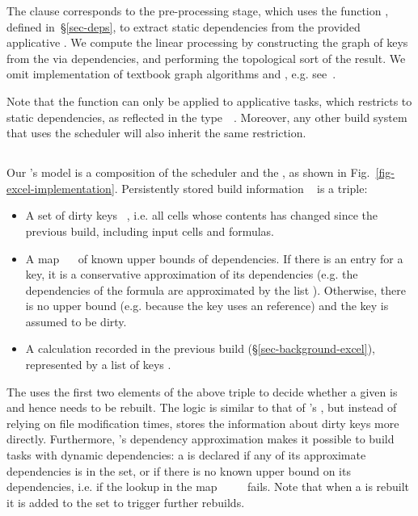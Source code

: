 The  clause corresponds to the pre-processing stage, which uses the
function , defined in~\S\ref{sec-deps}, to extract static
dependencies from the provided applicative . We compute the linear
processing  by constructing the graph of keys  from the
 via dependencies, and performing the topological sort of the result.
We omit implementation of textbook graph algorithms
 and , e.g. see~\cite{cormen2001introduction}.

Note that the function  can only be applied to applicative
tasks, which restricts \Make to static dependencies, as reflected in the
type~~. Moreover, any other build system that uses
the  scheduler will also inherit the same restriction.

\subsection{\Excel}\label{sec-implementation-excel}

Our \Excel's model is a composition of the  scheduler and the
, as shown in Fig.~\ref{fig-excel-implementation}.
Persistently stored build information ~ is a triple:

\begin{itemize}
    \item A set of dirty keys ~, i.e. all cells whose contents
          has changed since the previous build, including input cells and
          formulas.
    \item A map ~~\hs{[@@k]} of known upper bounds of
          dependencies. If there is an entry for a key, it is a conservative
          approximation of its dependencies (e.g. the dependencies of the
          formula  are approximated by the list
          \hs{[}\hs{,}\hs{,}\hs{]}). Otherwise, there is
          no upper bound (e.g. because the key uses an  reference)
          and the key is assumed to be dirty.
    \item A calculation  recorded in the previous build
          (\S\ref{sec-background-excel}), represented by a list of keys \hs{[@@k]}.
\end{itemize}

The  uses the first two elements of the above triple
to decide whether a given  is  and hence needs to be rebuilt.
The logic is similar to that of \Make's , but instead of
relying on file modification times, \Excel stores the information about dirty
keys more directly. Furthermore, \Excel's dependency approximation makes it
possible to build tasks with dynamic dependencies: a  is declared
 if any of its approximate dependencies is in the  set,
or if there is no known upper bound on its dependencies, i.e. if the lookup in
the map ~\hs{::}~~~\hs{[@@k]} fails. Note that when a
 is rebuilt it is added to the set  to trigger further
rebuilds.

